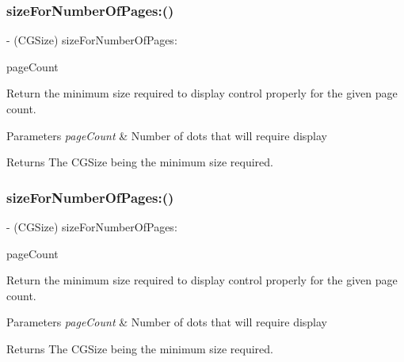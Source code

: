 \subsubsection{\texorpdfstring{size\+For\+Number\+Of\+Pages\+:()}{sizeForNumberOfPages:()}\hspace{0.1cm}{\footnotesize\ttfamily [1/3]}}
{\footnotesize\ttfamily -\/ (C\+G\+Size) size\+For\+Number\+Of\+Pages\+: \begin{DoxyParamCaption}\item[{(N\+S\+Integer)}]{page\+Count }\end{DoxyParamCaption}}

Return the minimum size required to display control properly for the given page count.


\begin{DoxyParams}{Parameters}
{\em page\+Count} & Number of dots that will require display\\
\hline
\end{DoxyParams}
\begin{DoxyReturn}{Returns}
The C\+G\+Size being the minimum size required. 
\end{DoxyReturn}
\mbox{\label{interface_t_a_page_control_a215bb7b5e6e6db8e5146d751e6fe7719}} 
\subsubsection{\texorpdfstring{size\+For\+Number\+Of\+Pages\+:()}{sizeForNumberOfPages:()}\hspace{0.1cm}{\footnotesize\ttfamily [2/3]}}
{\footnotesize\ttfamily -\/ (C\+G\+Size) size\+For\+Number\+Of\+Pages\+: \begin{DoxyParamCaption}\item[{(N\+S\+Integer)}]{page\+Count }\end{DoxyParamCaption}}

Return the minimum size required to display control properly for the given page count.


\begin{DoxyParams}{Parameters}
{\em page\+Count} & Number of dots that will require display\\
\hline
\end{DoxyParams}
\begin{DoxyReturn}{Returns}
The C\+G\+Size being the minimum size required. 
\end{DoxyReturn}
\mbox{\label{interface_t_a_page_control_a215bb7b5e6e6db8e5146d751e6fe7719}} 
